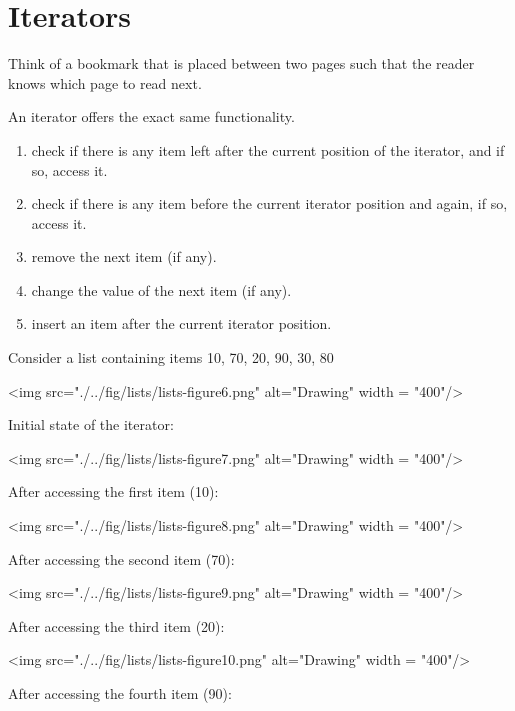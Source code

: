 \section{Iterators}

Think of a bookmark that is placed between two pages such that the reader knows which page to read next.

An iterator offers the exact same functionality. 

\begin{enumerate}
  \item check if there is any item left after the current position of the iterator, and if so, access it. 
  \item check if there is any item before the current iterator position and again, if so, access it. 
  \item remove the next item (if any).
  \item change the value of the next item (if any).
  \item insert an item after the current iterator position.
\end{enumerate}

\vskip 1mm

Consider a list containing items 10, 70, 20, 90, 30, 80
\vskip 1mm

<img src="./../fig/lists/lists-figure6.png" alt="Drawing" width = "400"/>

\newpage

Initial state of the iterator:
\vskip 1mm

<img src="./../fig/lists/lists-figure7.png" alt="Drawing" width = "400"/>

\vskip 1mm

After accessing the first item (10):
\vskip 1mm

<img src="./../fig/lists/lists-figure8.png" alt="Drawing" width = "400"/>

\vskip 1mm

After accessing the second item (70):
\vskip 1mm

<img src="./../fig/lists/lists-figure9.png" alt="Drawing" width = "400"/>

\vskip 1mm

After accessing the third item (20):
\vskip 1mm

<img src="./../fig/lists/lists-figure10.png" alt="Drawing" width = "400"/>

\vskip 1mm

After accessing the fourth item (90):
\vskip 1mm

